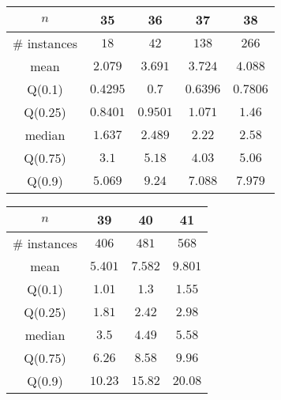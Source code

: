 \begin{tabular}{c|cccc} 
\hline 
$n$ & 35 & 36 & 37 & 38 \tabularnewline 
\hline 
\hline 
\# instances & $18$ & $42$ & $138$ & $266$ \tabularnewline 
mean & $2.079$ & $3.691$ & $3.724$ & $4.088$ \tabularnewline 
Q(0.1) & $0.4295$ & $0.7$ & $0.6396$ & $0.7806$ \tabularnewline 
Q(0.25) & $0.8401$ & $0.9501$ & $1.071$ & $1.46$ \tabularnewline 
median & $1.637$ & $2.489$ & $2.22$ & $2.58$ \tabularnewline 
Q(0.75) & $3.1$ & $5.18$ & $4.03$ & $5.06$ \tabularnewline 
Q(0.9) & $5.069$ & $9.24$ & $7.088$ & $7.979$ \tabularnewline 
\hline 
\end{tabular} 
\medskip{} 

\begin{tabular}{c|ccc} 
\hline 
$n$ & 39 & 40 & 41 \tabularnewline 
\hline 
\hline 
\# instances & $406$ & $481$ & $568$ \tabularnewline 
mean & $5.401$ & $7.582$ & $9.801$ \tabularnewline 
Q(0.1) & $1.01$ & $1.3$ & $1.55$ \tabularnewline 
Q(0.25) & $1.81$ & $2.42$ & $2.98$ \tabularnewline 
median & $3.5$ & $4.49$ & $5.58$ \tabularnewline 
Q(0.75) & $6.26$ & $8.58$ & $9.96$ \tabularnewline 
Q(0.9) & $10.23$ & $15.82$ & $20.08$ \tabularnewline 
\hline 
\end{tabular} 
\medskip{} 

